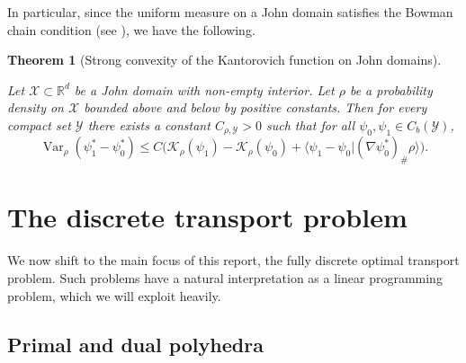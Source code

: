 \documentclass[11pt, oneside, titlepage]{book}
\theoremstyle{plain}
\newtheorem{theorem}{Theorem}[chapter]
\theoremstyle{definition}
\newcommand{\R}{\mathbb{R}}
\newcommand{\K}{\mathcal{K}}
\newcommand{\X}{\mathcal{X}}
\newcommand{\Y}{\mathcal{Y}}
\DeclareMathOperator{\var}{Var}
\begin{document}
In particular, since the uniform measure on a John domain satisfies the Bowman chain condition (see \cite[Lemma 2.1]{boman1982lp}), we have the following.
\begin{theorem}[Strong convexity of the Kantorovich function on John domains]
    \label{thrm: John domain stronger inequality}

    Let $\X\subset \R^d$ be a John domain with non-empty interior. Let $\rho$ be a probability density on $\X$ bounded above and below by positive constants. Then for every compact set $\Y$ there exists a constant $C_{\rho, \Y} >0$ such that for all $\psi_0, \psi_1 \in C_b(\Y)$,
    \begin{equation*}
        \var_\rho(\psi_1^* - \psi_0^*) \leq C \bigg(\K_\rho(\psi_1) -\K_\rho(\psi_0) + \langle \psi_1 - \psi_0 | (\nabla\psi_0^*)_\# \rho \rangle \bigg).
    \end{equation*}
\end{theorem}
\chapter{The discrete transport problem}
\label{ch: discrete transport problem}
We now shift to the main focus of this report, the fully discrete optimal transport problem. Such problems have a natural interpretation as a linear programming problem, which we will exploit heavily.


\section{Primal and dual polyhedra}
\end{document}
